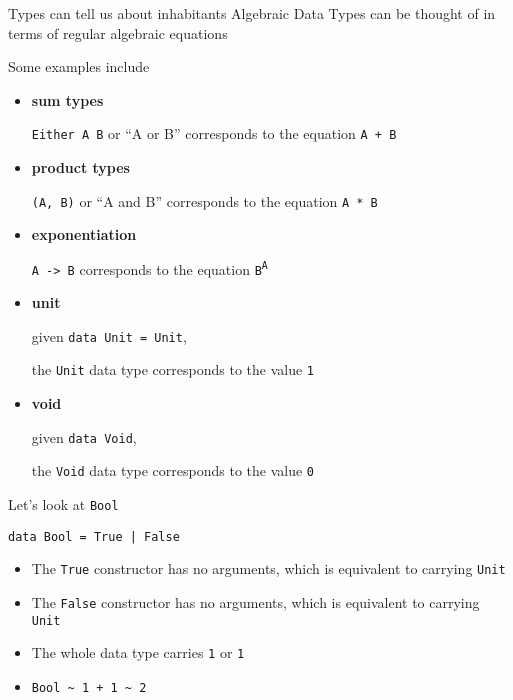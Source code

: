 \begin{frame}
\begin{block}{Types can tell us about inhabitants}
Algebraic Data Types can be thought of in terms of regular algebraic equations
\end{block}
\end{frame}

\begin{frame}
\begin{block}{Some examples include}
\begin{itemize}
  \item \textbf{sum types}

        \lstinline{Either A B} or ``A or B'' corresponds to the equation \lstinline{A + B}
  \item \textbf{product types}

        \lstinline{(A, B)} or ``A and B'' corresponds to the equation \lstinline{A * B}
  \item \textbf{exponentiation}

        \lstinline{A -> B} corresponds to the equation \lstinline{B}\textsuperscript{\lstinline{A}}
  \item \textbf{unit}

        given \lstinline{data Unit = Unit},

        the \lstinline{Unit} data type corresponds to the value \lstinline{1}
  \item \textbf{void}

        given \lstinline{data Void},

        the \lstinline{Void} data type corresponds to the value \lstinline{0}
\end{itemize}
\end{block}
\end{frame}

\begin{frame}[fragile]
\begin{block}{Let's look at \lstinline{Bool}}
\begin{lstlisting}
data Bool = True | False
\end{lstlisting}
\begin{itemize}
  \item<1-> The \lstinline{True} constructor has no arguments, which is equivalent to carrying \lstinline{Unit}
  \item<1-> The \lstinline{False} constructor has no arguments, which is equivalent to carrying \lstinline{Unit}
  \item<2-> The whole data type carries \lstinline{1} or \lstinline{1}
  \item<2-> \lstinline{Bool ~ 1 + 1 ~ 2}
\end{itemize}
\end{block}
\end{frame}

